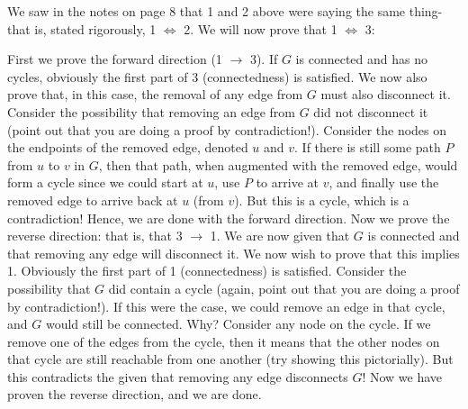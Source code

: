 \question We saw in the notes on page 8 that 1 and 2 above were saying 
the same thing- that is, stated rigorously, 1 $\Leftrightarrow$ 2. 
We will now prove that 1 $\Leftrightarrow$ 3:
\begin{solution}
First we prove the forward direction (1 $\rightarrow$ 3). If $G$ is 
connected and has no cycles, obviously the first part of 3 (connectedness) 
is satisfied. We now also prove that, in this case, the removal of any 
edge from $G$ must also disconnect it. Consider the possibility that 
removing an edge from $G$ did not disconnect it (point out that you 
are doing a proof by contradiction!). Consider the nodes on the 
endpoints of the removed edge, denoted $u$ and $v$. If there is still 
some path $P$ from $u$ to $v$ in $G$, then that path, when augmented 
with the removed edge, would form a cycle since we could start at $u$, 
use $P$ to arrive at $v$, and finally use the removed edge to arrive 
back at $u$ (from $v$). But this is a cycle, which is a contradiction! 
Hence, we are done with the forward direction. \newline
Now we prove the reverse direction: that is, that 3 $\rightarrow$ 1. 
We are now  given that $G$ is connected and that removing any edge 
will disconnect it. We now wish to prove that this implies 1. Obviously 
the first part of 1 (connectedness) is satisfied. Consider the 
possibility that $G$ did contain a cycle (again, point out that you 
are doing a proof by contradiction!). If this were the case, we could 
remove an edge in that cycle, and $G$ would still be connected. Why? 
Consider any node on the cycle. If we remove one of the edges from the 
cycle, then it means that the other nodes on that cycle are still 
reachable from one another (try showing this pictorially). But this 
contradicts the given that removing any edge disconnects $G$! Now we 
have proven the reverse direction, and we are done. 
\end{solution}

\clearpage